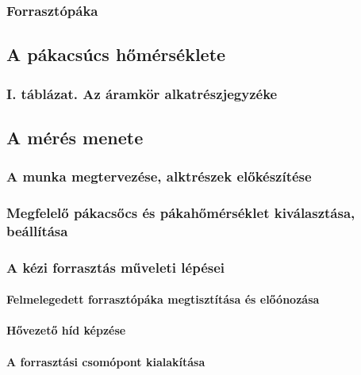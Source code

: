 \documentclass[../labor.tex]{subfiles}
\begin{document}
        \subsubsection{Forrasztópáka}

    \subsection{A pákacsúcs hőmérséklete}

        \subsubsection{I. táblázat. Az áramkör alkatrészjegyzéke}

    \subsection{A mérés menete}

        \subsubsection{A munka megtervezése, alktrészek előkészítése}

        \subsubsection{Megfelelő pákacsőcs és pákahőmérséklet kiválasztása, beállítása}

        \subsubsection{A kézi forrasztás műveleti lépései}

            \setcounter{secnumdepth}{4}

                \paragraph{Felmelegedett forrasztópáka megtisztítása és előónozása}

                \paragraph{Hővezető híd képzése}

                \paragraph{A forrasztási csomópont kialakítása}
\end{document}
